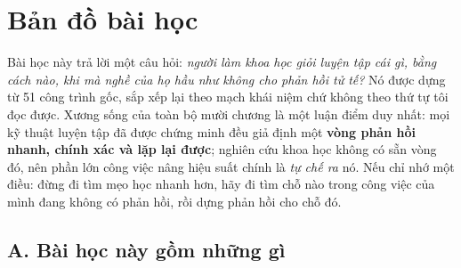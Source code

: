 \documentclass[hieu-suat.tex]{subfiles}
\begin{document}
\chapter*{Bản đồ bài học}

\begin{tomtat}
Bài học này trả lời một câu hỏi: \emph{người làm khoa học giỏi luyện tập cái gì, bằng cách nào, khi mà nghề của họ hầu như không cho phản hồi tử tế?} Nó được dựng từ 51 công trình gốc, sắp xếp lại theo mạch khái niệm chứ không theo thứ tự tôi đọc được. Xương sống của toàn bộ mười chương là một luận điểm duy nhất: mọi kỹ thuật luyện tập đã được chứng minh đều giả định một \textbf{vòng phản hồi nhanh, chính xác và lặp lại được}; nghiên cứu khoa học không có sẵn vòng đó, nên phần lớn công việc nâng hiệu suất chính là \emph{tự chế ra} nó. Nếu chỉ nhớ một điều: đừng đi tìm mẹo học nhanh hơn, hãy đi tìm chỗ nào trong công việc của mình đang không có phản hồi, rồi dựng phản hồi cho chỗ đó.
\end{tomtat}

\section*{A. Bài học này gồm những gì}
\end{document}
